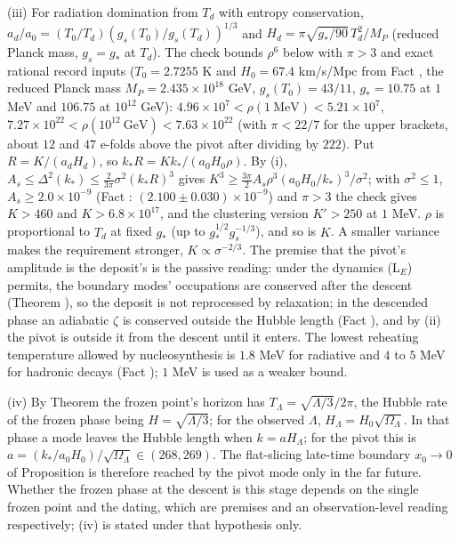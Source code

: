 (iii) For radiation domination from $T_{d}$ with entropy conservation, $a_{d}/a_{0} = (T_{0}/T_{d})(g_{s}(T_{0})/g_{s}(T_{d}))^{1/3}$ and $H_{d} = \pi\sqrt{g_{*}/90}\,T_{d}^{2}/M_{P}$ (reduced Planck mass, $g_{s} = g_{*}$ at $T_{d}$). The check bounds $\rho^{6}$ below with $\pi > 3$ and exact rational record inputs ($T_{0} = 2.7255$ K and $H_{0} = 67.4$ km/s/Mpc from Fact , the reduced Planck mass $M_{P} = 2.435 \times 10^{18}$ GeV, $g_{s}(T_{0}) = 43/11$, $g_{*} = 10.75$ at $1$ MeV and $106.75$ at $10^{12}$ GeV): $4.96 \times 10^{7} < \rho(1\ \mathrm{MeV}) < 5.21 \times 10^{7}$, $7.27 \times 10^{22} < \rho(10^{12}\ \mathrm{GeV}) < 7.63 \times 10^{22}$ (with $\pi < 22/7$ for the upper brackets, about $12$ and $47$ e-folds above the pivot after dividing by $222$). Put $R = K/(a_{d}H_{d})$, so $k_{*}R = K k_{*}/(a_{0}H_{0}\rho)$. By (i), $A_{s} \le \Delta^{2}(k_{*}) \le \tfrac{2}{3\pi}\sigma^{2}(k_{*}R)^{3}$ gives $K^{3} \ge \tfrac{3\pi}{2}A_{s}\rho^{3}(a_{0}H_{0}/k_{*})^{3}/\sigma^{2}$; with $\sigma^{2} \le 1$, $A_{s} \ge 2.0 \times 10^{-9}$ (Fact : $(2.100 \pm 0.030) \times 10^{-9}$) and $\pi > 3$ the check gives $K > 460$ and $K > 6.8 \times 10^{17}$, and the clustering version $K' > 250$ at $1$ MeV. $\rho$ is proportional to $T_{d}$ at fixed $g_{*}$ (up to $g_{*}^{1/2}g_{s}^{-1/3}$), and so is $K$. A smaller variance makes the requirement stronger, $K \propto \sigma^{-2/3}$. The premise that the pivot's amplitude is the deposit's is the passive reading: under the dynamics (L$_{E}$) permits, the boundary modes' occupations are conserved after the descent (Theorem ), so the deposit is not reprocessed by relaxation; in the descended phase an adiabatic $\zeta$ is conserved outside the Hubble length (Fact ), and by (ii) the pivot is outside it from the descent until it enters. The lowest reheating temperature allowed by nucleosynthesis is $1.8$ MeV for radiative and $4$ to $5$ MeV for hadronic decays (Fact ); $1$ MeV is used as a weaker bound.

(iv) By Theorem  the frozen point's horizon has $T_{\Lambda} = \sqrt{\Lambda/3}/2\pi$, the Hubble rate of the frozen phase being $H = \sqrt{\Lambda/3}$; for the observed $\Lambda$, $H_{\Lambda} = H_{0}\sqrt{\Omega_{\Lambda}}$. In that phase a mode leaves the Hubble length when $k = aH_{\Lambda}$; for the pivot this is $a = (k_{*}/a_{0}H_{0})/\sqrt{\Omega_{\Lambda}} \in (268, 269)$. The flat-slicing late-time boundary $x_{0} \to 0$ of Proposition  is therefore reached by the pivot mode only in the far future. Whether the frozen phase at the descent is this stage depends on the single frozen point and the dating, which are premises and an observation-level reading respectively; (iv) is stated under that hypothesis only.

